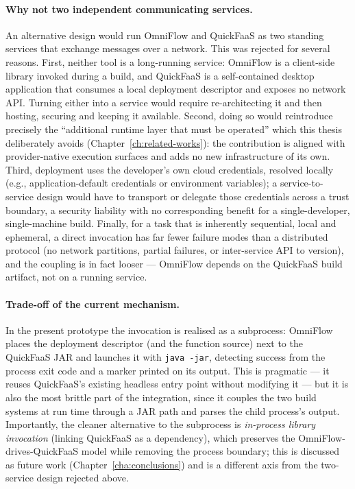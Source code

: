 \paragraph{Why not two independent communicating services.}
An alternative design would run OmniFlow and QuickFaaS as two standing services that exchange
messages over a network. This was rejected for several reasons. First, neither tool is a
long-running service: OmniFlow is a client-side library invoked during a build, and QuickFaaS is a
self-contained desktop application that consumes a local deployment descriptor and exposes no
network API. Turning either into a service would require re-architecting it and then hosting,
securing and keeping it available. Second, doing so would reintroduce precisely the
``additional runtime layer that must be operated'' which this thesis deliberately avoids
(Chapter~\ref{ch:related-works}): the contribution is aligned with provider-native execution
surfaces and adds no new infrastructure of its own. Third, deployment uses the developer's own
cloud credentials, resolved locally (e.g., application-default credentials or environment
variables); a service-to-service design would have to transport or delegate those credentials
across a trust boundary, a security liability with no corresponding benefit for a single-developer,
single-machine build. Finally, for a task that is inherently sequential, local and ephemeral, a
direct invocation has far fewer failure modes than a distributed protocol (no network partitions,
partial failures, or inter-service API to version), and the coupling is in fact looser --- OmniFlow
depends on the QuickFaaS build artifact, not on a running service.

\paragraph{Trade-off of the current mechanism.}
In the present prototype the invocation is realised as a subprocess: OmniFlow places the deployment
descriptor (and the function source) next to the QuickFaaS JAR and launches it with
\texttt{java\ -jar}, detecting success from the process exit code and a marker printed on its
output. This is pragmatic --- it reuses QuickFaaS's existing headless entry point without modifying
it --- but it is also the most brittle part of the integration, since it couples the two build
systems at run time through a JAR path and parses the child process's output. Importantly, the
cleaner alternative to the subprocess is \emph{in-process library invocation} (linking QuickFaaS as
a dependency), which preserves the OmniFlow-drives-QuickFaaS model while removing the process
boundary; this is discussed as future work (Chapter~\ref{cha:conclusions}) and is a different axis
from the two-service design rejected above.

